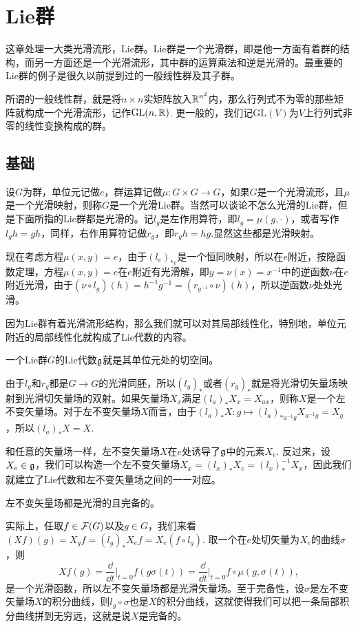 \chapter{Lie群}

这章处理一大类光滑流形，Lie群。Lie群是一个光滑群，即是他一方面有着群的结构，而另一方面还是一个光滑流形，其中群的运算乘法和逆是光滑的。最重要的Lie群的例子是很久以前提到过的一般线性群及其子群。

所谓的一般线性群，就是将$n\times n$实矩阵放入$\mathbb{R}^{n^2}$内，那么行列式不为零的那些矩阵就构成一个光滑流形，记作$\mathrm{GL}(n,\mathbb{R})$. 更一般的，我们记$\mathrm{GL}(V)$为$V$上行列式非零的线性变换构成的群。

\section{基础}

\para 设$G$为群，单位元记做$e$，群运算记做$\mu:G\times G\to G$，如果$G$是一个光滑流形，且$\mu$是一个光滑映射，则称$G$是一个光滑Lie群。当然可以谈论不怎么光滑的Lie群，但是下面所指的Lie群都是光滑的。记$l_g$是左作用算符，即$l_g=\mu(g,\cdot)$，或者写作$l_gh=gh$，同样，右作用算符记做$r_g$，即$r_gh=hg$.显然这些都是光滑映射。

现在考虑方程$\mu(x,y)=e$，由于$(l_e)_{*e}$是一个恒同映射，所以在$e$附近，按隐函数定理，方程$\mu(x,y)=e$在$e$附近有光滑解，即$y=\nu(x)=x^{-1}$中的逆函数$\nu$在$e$附近光滑，由于$(\nu\circ l_g)(h)=h^{-1}g^{-1}=(r_{g^{-1}}\circ \nu)(h)$，所以逆函数$\nu$处处光滑。

因为Lie群有着光滑流形结构，那么我们就可以对其局部线性化，特别地，单位元附近的局部线性化就构成了Lie代数的内容。

\para 一个Lie群$G$的Lie代数${\mathfrak{g}}$就是其单位元处的切空间。

由于$l_g$和$r_g$都是$G\to G$的光滑同胚，所以$(l_g)_*$或者$(r_g)_*$就是将光滑切矢量场映射到光滑切矢量场的双射。如果矢量场$X_x$满足$(l_a)_*X_x=X_{ax}$，则称$X$是一个左不变矢量场。对于左不变矢量场$X$而言，由于$(l_a)_*X:g\mapsto (l_a)_{*a^{-1}g}X_{a^{-1}g}=X_g$，所以$(l_a)_*X=X$.

和任意的矢量场一样，左不变矢量场$X$在$e$处诱导了${\mathfrak{g}}$中的元素$X_e$. 反过来，设$X_e\in{\mathfrak{g}}$，我们可以构造一个左不变矢量场$X_x=(l_{x})_*X_e=(l_x)^{-1}_*X_x$，因此我们就建立了Lie代数和左不变矢量场之间的一一对应。

\para 左不变矢量场都是光滑的且完备的。

实际上，任取$f\in\mathcal{F}(G)$以及$g\in G$，我们来看$(Xf)(g)=X_gf=(l_g)_{*}X_ef=X_e(f\circ l_g)$. 取一个在$e$处切矢量为$X_e$的曲线$\sigma$，则
\[
	Xf(g)=\frac{\dd }{\dd t}\bigg|_{t=0}f(g\sigma(t))=\frac{\dd }{\dd t}\bigg|_{t=0}f\circ \mu(g,\sigma(t)),
\]
是一个光滑函数，所以左不变矢量场都是光滑矢量场。至于完备性，设$\sigma$是左不变矢量场$X$的积分曲线，则$l_g\circ \sigma$也是$X$的积分曲线，这就使得我们可以把一条局部积分曲线拼到无穷远，这就是说$X$是完备的。

